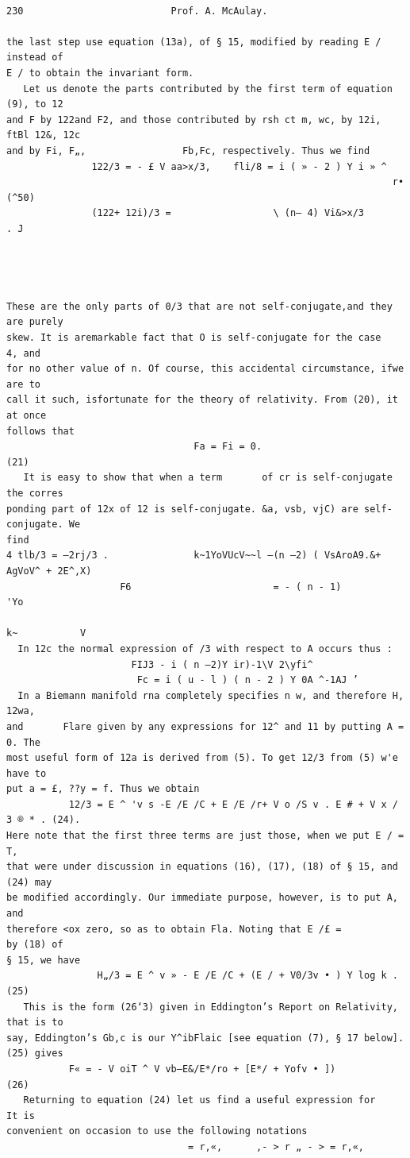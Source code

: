 \documentclass[10pt]{article}
\begin{document}
\clearpage
\begin{verbatim}

230                          Prof. A. McAulay.

the last step use equation (13a), of § 15, modified by reading E / instead of
E / to obtain the invariant form.
   Let us denote the parts contributed by the first term of equation (9), to 12
and F by 122and F2, and those contributed by rsh ct m, wc, by 12i, ftBl 12&, 12c
and by Fi, F„,                 Fb,Fc, respectively. Thus we find
               122/3 = - £ V aa>x/3,    fli/8 = i ( » - 2 ) Y i » ^
                                                                    r•     (^50)
               (122+ 12i)/3 =                  \ (n— 4) Vi&>x/3            . J




These are the only parts of 0/3 that are not self-conjugate,and they are purely
skew. It is aremarkable fact that O is self-conjugate for the case       4, and
for no other value of n. Of course, this accidental circumstance, ifwe are to
call it such, isfortunate for the theory of relativity. From (20), it at once
follows that
                                 Fa = Fi = 0.                               (21)
   It is easy to show that when a term       of cr is self-conjugate the corres­
ponding part of 12x of 12 is self-conjugate. &a, vsb, vjC) are self-conjugate. We
find
4 tlb/3 = —2rj/3 .               k~1YoVUcV~~l —(n —2) ( VsAroA9.&+ AgVoV^ + 2E^,X)
                    F6                         = - ( n - 1)             'Yo
                                                                         k~           V
  In 12c the normal expression of /3 with respect to A occurs thus :
                      FIJ3 - i ( n —2)Y ir)-1\V 2\yfi^
                       Fc = i ( u - l ) ( n - 2 ) Y 0A ^-1AJ ’
  In a Biemann manifold rna completely specifies n w, and therefore H, 12wa,
and       Flare given by any expressions for 12^ and 11 by putting A = 0. The
most useful form of 12a is derived from (5). To get 12/3 from (5) w'e have to
put a = £, ??y = f. Thus we obtain
           12/3 = E ^ 'v s -E /E /C + E /E /r+ V o /S v . E # + V x / 3 ® * . (24).
Here note that the first three terms are just those, when we put E / = T,
that were under discussion in equations (16), (17), (18) of § 15, and (24) may
be modified accordingly. Our immediate purpose, however, is to put A, and
therefore <ox zero, so as to obtain Fla. Noting that E /£ =            by (18) of
§ 15, we have
                H„/3 = E ^ v » - E /E /C + (E / + V0/3v • ) Y log k .        (25)
   This is the form (26‘3) given in Eddington’s Report on Relativity, that is to
say, Eddington’s Gb,c is our Y^ibFlaic [see equation (7), § 17 below]. (25) gives
           F« = - V oiT ^ V vb—E&/E*/ro + [E*/ + Yofv • ])                   (26)
   Returning to equation (24) let us find a useful expression for           It is
convenient on occasion to use the following notations
                                = r,«,      ,- > r „ - > = r,«,


\end{verbatim}
\end{document}
